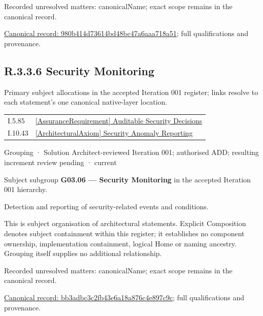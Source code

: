 {\small Recorded unresolved matters: canonicalName; exact scope remains in the canonical record.}\par
{\footnotesize \href{../../../../continuum/grouping/980b414d73614bd48bc47a6aaa718a51.md}{Canonical record: 980b414d73614bd48bc47a6aaa718a51}; full qualifications and provenance.}\par
\subsection*{R.3.3.6 Security Monitoring}
\label{navigation:R.3.3.6}

Primary subject allocations in the accepted Iteration 001 register; links resolve to each statement’s one canonical native-layer location.\par
\begin{longtable}{p{.22\linewidth}p{.73\linewidth}}
I.5.85 & \hyperref[element:92ef574eb9b945dfaf6cf2b1b670595b]{[AssuranceRequirement] Auditable Security Decisions} \\
I.10.43 & \hyperref[element:859f884874094c96a6ace15e17131a4c]{[ArchitecturalAxiom] Security Anomaly Reporting} \\
\end{longtable}
\label{element:bb3adbc3c2fb43e6a18a876c4e897c9c}
{\small Grouping · Solution Architect-reviewed Iteration 001; authorised ADD; resulting increment review pending · current}\par

Subject subgroup \textbf{G03.06 — Security Monitoring} in the accepted Iteration 001 hierarchy.



Detection and reporting of security-related events and conditions.



This is subject organisation of architectural statements. Explicit Composition denotes subject containment within this register; it establishes no component ownership, implementation containment, logical Home or naming ancestry. Grouping itself supplies no additional relationship.


{\small Recorded unresolved matters: canonicalName; exact scope remains in the canonical record.}\par
{\footnotesize \href{../../../../continuum/grouping/bb3adbc3c2fb43e6a18a876c4e897c9c.md}{Canonical record: bb3adbc3c2fb43e6a18a876c4e897c9c}; full qualifications and provenance.}\par
